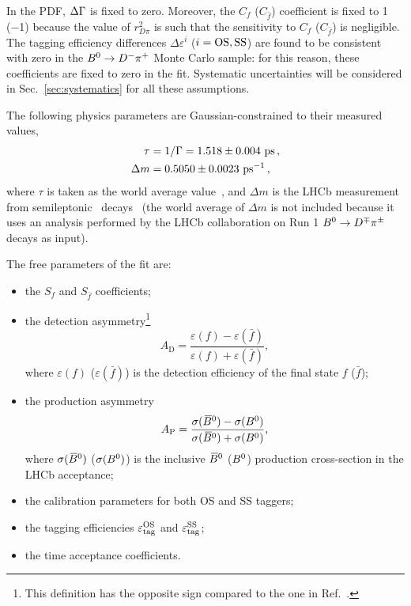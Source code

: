 In the PDF, $\Delta\Gamma$ is fixed to zero. Moreover, the $C_{f}$ ($C_{\bar{f}}$) coefficient is fixed to \num{+1} (\num{-1})
because the value of $r_{D\pi}^{2}$ is such that the sensitivity to $C_{f}$ ($C_{\bar{f}}$) is negligible.
The tagging efficiency differences $\Delta\varepsilon^{i}$ ($i=\rm OS, \rm SS$) are found to be consistent with zero in the $B^0\rightarrow D^-\pi^+$ Monte Carlo sample: for this
reason, these coefficients are fixed to zero in the fit. 
Systematic uncertainties will
be considered in Sec.~\ref{sec:systematics} for all these assumptions.

The following physics parameters are Gaussian-constrained to their measured values,
\begin{align}
  \label{eq:gauss-cons}
  \tau &= 1/\Gamma = 1.518\pm0.004~\rm ps\,,\\
  \Delta m &= 0.5050\pm0.0023~\rm ps^{-1}\,,
\end{align}
where $\tau$ is taken as the world average value~\cite{HFLAV16}, and $\Delta m$ is the LHCb measurement from
semileptonic \Bz~decays~\cite{LHCB-PAPER-2015-031} (the world average of $\Delta m$ is not included because
it uses an analysis performed by the LHCb collaboration on Run 1 $B^0\rightarrow D^\mp\pi^\pm$ decays as input).

The free parameters of the fit are:
\begin{itemize}[noitemsep,topsep=0pt]
\item the $S_{f}$ and $S_{\bar f}$ coefficients;
\item the detection
asymmetry\footnote{This definition has the opposite sign compared to the one in Ref.~\cite{LHCb-PAPER-2016-062}.} 
\begin{equation}
  \label{eq:adet}
  A_{\mathrm{D}}=\frac{\varepsilon(f)-\varepsilon(\bar f)}{\varepsilon(f)+\varepsilon(\bar f)},
\end{equation}
where $\varepsilon(f)$ ($\varepsilon(\bar f)$) is the detection efficiency of the final state $f$ ($\bar f$);
\item the production asymmetry
\begin{equation}
  \label{eq:aprod}
  A_{\mathrm{P}}=\frac{\sigma(\kern 0.18em\overline{\kern -0.18em B}{}^0)-\sigma(B^0)}{\sigma(\kern 0.18em\overline{\kern -0.18em B}{}^0)+\sigma(B^0)},
\end{equation}
where $\sigma(\kern 0.18em\overline{\kern -0.18em B}{}^0)$ ($\sigma(B^0)$) is the inclusive $\kern 0.18em\overline{\kern -0.18em B}{}^0$ ($B^0$) production cross-section in the LHCb acceptance;
\item the calibration parameters for both OS and SS taggers;
\item the tagging efficiencies $\varepsilon_{\rm tag}^{\rm OS}$ and $\varepsilon_{\rm tag}^{\rm SS}$;
\item the time acceptance coefficients.
\end{itemize}

